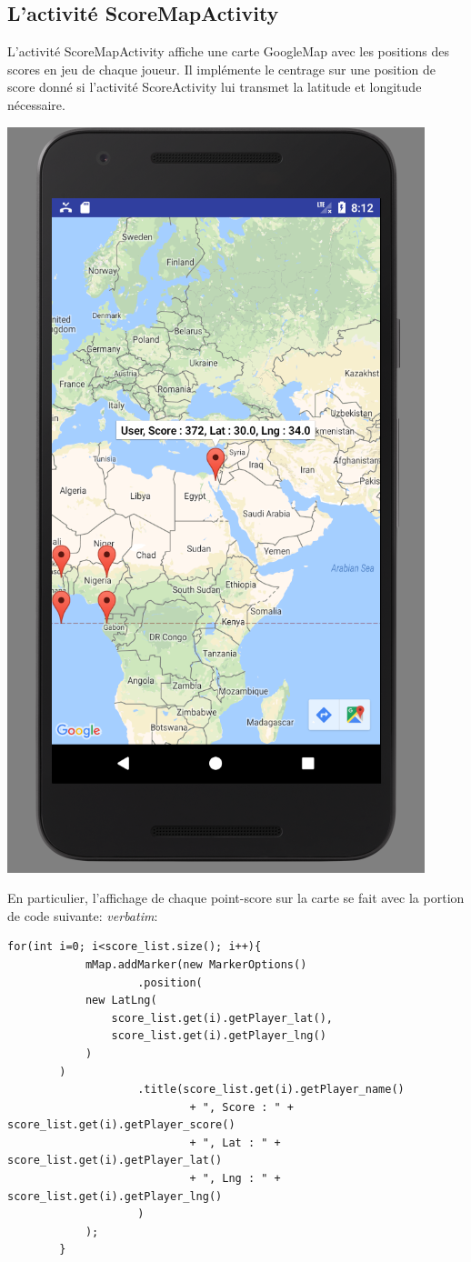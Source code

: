 \documentclass{article}
\begin{document}
\subsection{L'activité ScoreMapActivity}
L'activité ScoreMapActivity affiche une carte GoogleMap avec les positions des scores en jeu de chaque joueur. Il implémente le centrage sur une position de score donné si l'activité ScoreActivity lui transmet la latitude et longitude nécessaire.
\begin{center}
  \includegraphics[scale=0.5]{ScoreMapActivity.png}
\end{center}
En particulier, l'affichage de chaque point-score sur la carte se fait avec la portion de code suivante:
\textit{verbatim}:
\begin{verbatim}
for(int i=0; i<score_list.size(); i++){
            mMap.addMarker(new MarkerOptions()
                    .position(
			new LatLng(
				score_list.get(i).getPlayer_lat(),
				score_list.get(i).getPlayer_lng()
			)
		)
                    .title(score_list.get(i).getPlayer_name()
                            + ", Score : " + score_list.get(i).getPlayer_score()
                            + ", Lat : " + score_list.get(i).getPlayer_lat()
                            + ", Lng : " + score_list.get(i).getPlayer_lng()
                    )
            );
        }
\end{verbatim}
\end{document}
